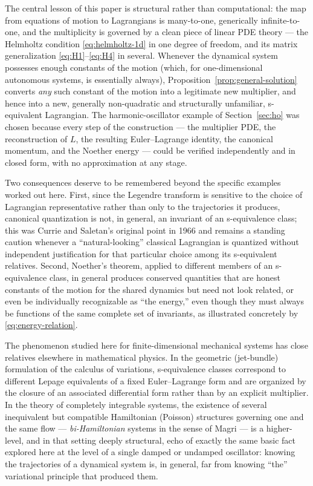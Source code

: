 \documentclass[11pt]{article}
\theoremstyle{remark}
\begin{document}
The central lesson of this paper is structural rather than computational: the map from equations of motion to Lagrangians is many-to-one, generically infinite-to-one, and the multiplicity is governed by a clean piece of linear PDE theory --- the Helmholtz condition \eqref{eq:helmholtz-1d} in one degree of freedom, and its matrix generalization \eqref{eq:H1}--\eqref{eq:H4} in several. Whenever the dynamical system possesses enough constants of the motion (which, for one-dimensional autonomous systems, is essentially always), Proposition~\ref{prop:general-solution} converts \emph{any} such constant of the motion into a legitimate new multiplier, and hence into a new, generally non-quadratic and structurally unfamiliar, s-equivalent Lagrangian. The harmonic-oscillator example of Section~\ref{sec:ho} was chosen because every step of the construction --- the multiplier PDE, the reconstruction of $L$, the resulting Euler--Lagrange identity, the canonical momentum, and the Noether energy --- could be verified independently and in closed form, with no approximation at any stage.

Two consequences deserve to be remembered beyond the specific examples worked out here. First, since the Legendre transform is sensitive to the choice of Lagrangian representative rather than only to the trajectories it produces, canonical quantization is not, in general, an invariant of an s-equivalence class; this was Currie and Saletan's original point in 1966 \cite{CurrieSaletan1966} and remains a standing caution whenever a ``natural-looking'' classical Lagrangian is quantized without independent justification for that particular choice among its s-equivalent relatives. Second, Noether's theorem, applied to different members of an s-equivalence class, in general produces conserved quantities that are honest constants of the motion for the shared dynamics but need not look related, or even be individually recognizable as ``the energy,'' even though they must always be functions of the same complete set of invariants, as illustrated concretely by \eqref{eq:energy-relation}.

The phenomenon studied here for finite-dimensional mechanical systems has close relatives elsewhere in mathematical physics. In the geometric (jet-bundle) formulation of the calculus of variations, s-equivalence classes correspond to different Lepage equivalents of a fixed Euler--Lagrange form and are organized by the closure of an associated differential form rather than by an explicit multiplier. In the theory of completely integrable systems, the existence of several inequivalent but compatible Hamiltonian (Poisson) structures governing one and the same flow --- \emph{bi-Hamiltonian} systems in the sense of Magri \cite{Magri1978} --- is a higher-level, and in that setting deeply structural, echo of exactly the same basic fact explored here at the level of a single damped or undamped oscillator: knowing the trajectories of a dynamical system is, in general, far from knowing ``the'' variational principle that produced them.
\end{document}
